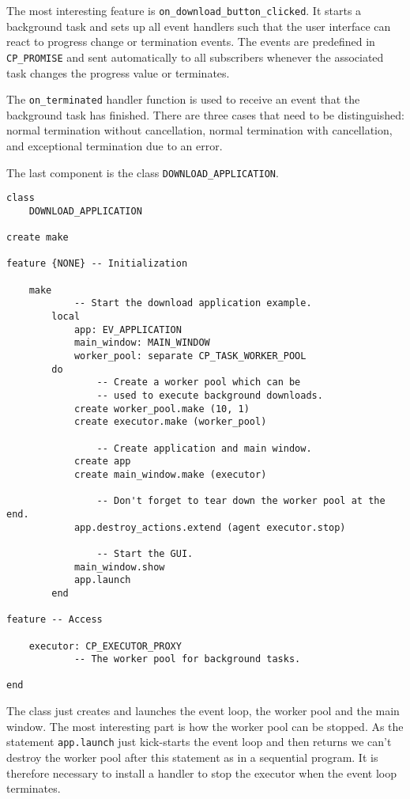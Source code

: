 The most interesting feature is \lstinline!on_download_button_clicked!.
It starts a background task and sets up all event handlers such that the user interface can react to progress change or termination events.
The events are predefined in \lstinline!CP_PROMISE! and sent automatically to all subscribers whenever the associated task changes the progress value or terminates.

The \lstinline!on_terminated! handler function is used to receive an event that the background task has finished.
There are three cases that need to be distinguished: normal termination without cancellation, normal termination with cancellation, and exceptional termination due to an error.

The last component is the class \lstinline!DOWNLOAD_APPLICATION!.

\begin{lstlisting}[language=OOSC2Eiffel, label={code:download-application}, captionpos=b, caption={Download application root class.}]
class
	DOWNLOAD_APPLICATION

create make

feature {NONE} -- Initialization

	make
			-- Start the download application example.
		local
			app: EV_APPLICATION
			main_window: MAIN_WINDOW
			worker_pool: separate CP_TASK_WORKER_POOL
		do
				-- Create a worker pool which can be 
				-- used to execute background downloads.
			create worker_pool.make (10, 1)
			create executor.make (worker_pool)

				-- Create application and main window.
			create app
			create main_window.make (executor)

				-- Don't forget to tear down the worker pool at the end.
			app.destroy_actions.extend (agent executor.stop)

				-- Start the GUI.
			main_window.show
			app.launch
		end

feature -- Access

	executor: CP_EXECUTOR_PROXY
			-- The worker pool for background tasks.

end
\end{lstlisting}

The class just creates and launches the event loop, the worker pool and the main window.
The most interesting part is how the worker pool can be stopped.
As the statement \lstinline!app.launch! just kick-starts the event loop and then returns we can't destroy the worker pool after this statement as in a sequential program.
It is therefore necessary to install a handler to stop the executor when the event loop terminates.

